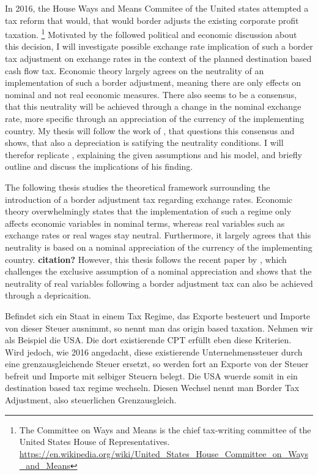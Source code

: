 In 2016, the House Ways and Means Commitee of the United states attempted a tax reform that would, that would border adjusts the existing corporate profit taxation. \footnote{The Committee on Ways and Means is the chief tax-writing committee of the United States House of Representatives. \url{https://en.wikipedia.org/wiki/United_States_House_Committee_on_Ways_and_Means}} Motivated by the followed political and economic discussion about this decision, I will investigate possible exchange rate implication of such a border tax adjustment on exchange rates in the context of the planned destination based cash flow tax.  Economic theory largely agrees on the neutrality of an implementation of such a border adjustment, meaning there are only effects on nominal and not real economic measures. There also seems to be a consensus, that this neutrality will be achieved through a change in the nominal exchange rate, more specific through an appreciation of the currency of the implementing country. My thesis will follow the work of 
\cite{buiter2017exchange}, that questions this consensus and shows, that also a depreciation is satifying the neutrality conditions. I will therefor replicate \cite{buiter2017exchange}, explaining the given assumptions and his model, and briefly outline and discuss the implications of his finding.  

The following thesis studies the theoretical framework surrounding the introduction of a border adjustment tax regarding exchange rates. Economic theory overwhelmingly states that the implementation of such a regime only affects economic variables in nominal terms, whereas real variables such as exchange rates or real wages stay neutral. Furthermore, it largely agrees that this neutrality is based on a nominal appreciation of the currency of the implementing country. \textbf{citation?} However, this thesis follows the recent paper by \cite{buiter2017exchange}, which challenges the exclusive assumption of a nominal appreciation and shows that the neutrality of real variables following a border adjustment tax can also be achieved through a depricaition. 

Befindet sich ein Staat in einem Tax Regime, das Exporte besteuert und Importe von dieser Steuer ausnimmt, so nennt man das origin based taxation. Nehmen wir als Beispiel die USA. Die dort existierende CPT erfüllt eben diese Kriterien. Wird jedoch, wie 2016 angedacht, diese existierende Unternehmenssteuer durch eine grenzausgleichende Steuer ersetzt, so werden fort an Exporte von der Steuer befreit und Importe mit selbiger Steuern belegt. Die USA wuerde somit in ein destination based tax regime wechseln. 
Diesen Wechsel nennt man Border Tax Adjustment, also steuerlichen Grenzausgleich.

